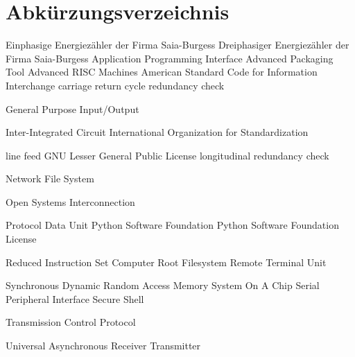 
\chapter*{Abkürzungsverzeichnis}
\begin{acronym}[abbreviations]



 {Einphasige Energiezähler der Firma Saia-Burgess}
 {Dreiphasiger Energiezähler der Firma Saia-Burgess}
 {Application Programming Interface}
 {Advanced Packaging Tool}
 {Advanced \acs{RISC} Machines}
 {American Standard Code for Information Interchange}
 {carriage return}
 {cycle redundancy check}

 {General Purpose Input/Output}

 {Inter-Integrated Circuit}
 {International Organization for Standardization}

 {line feed}
 {GNU Lesser General Public License}
 {longitudinal redundancy check}

 {Network File System}

 {Open Systems Interconnection}

 {Protocol Data Unit}
 {Python Software Foundation}
 {Python Software Foundation License}

 {Reduced Instruction Set Computer}
 {Root Filesystem}
 {Remote Terminal Unit}

 {Synchronous Dynamic Random Access Memory}
 {System On A Chip}
 {Serial Peripheral Interface}
 {Secure Shell}

 {Transmission Control Protocol}

 {Universal Asynchronous Receiver Transmitter}
\end{acronym}
